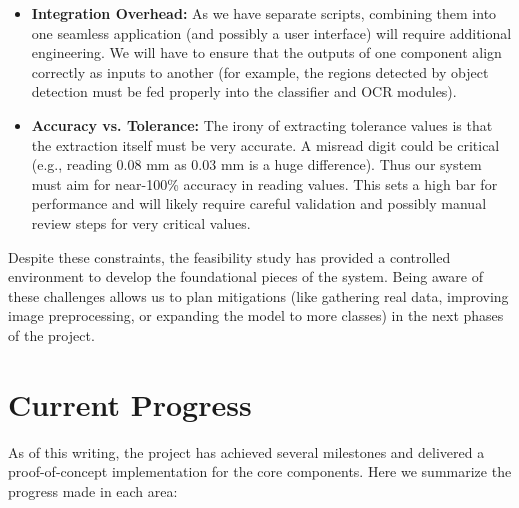 \documentclass[11pt,a4paper]{article}
\begin{document}
\begin{itemize}
  \item \textbf{Integration Overhead:} As we have separate scripts, combining them into one seamless application (and possibly a user interface) will require additional engineering. We will have to ensure that the outputs of one component align correctly as inputs to another (for example, the regions detected by object detection must be fed properly into the classifier and OCR modules).
  \item \textbf{Accuracy vs. Tolerance:} The irony of extracting tolerance values is that the extraction itself must be very accurate. A misread digit could be critical (e.g., reading 0.08 mm as 0.03 mm is a huge difference). Thus our system must aim for near-100\% accuracy in reading values. This sets a high bar for performance and will likely require careful validation and possibly manual review steps for very critical values.
\end{itemize}

Despite these constraints, the feasibility study has provided a controlled environment to develop the foundational pieces of the system. Being aware of these challenges allows us to plan mitigations (like gathering real data, improving image preprocessing, or expanding the model to more classes) in the next phases of the project.

\section{Current Progress}
As of this writing, the project has achieved several milestones and delivered a proof-of-concept implementation for the core components. Here we summarize the progress made in each area:
\end{document}
